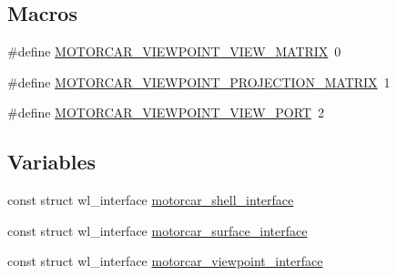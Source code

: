 \subsection*{Macros}
\begin{DoxyCompactItemize}
\item 
\#define \hyperlink{clients_2simple-egl_2motorcar-server-protocol_8h_a3cec8e451ef597650403195a97bfd54c}{M\-O\-T\-O\-R\-C\-A\-R\-\_\-\-V\-I\-E\-W\-P\-O\-I\-N\-T\-\_\-\-V\-I\-E\-W\-\_\-\-M\-A\-T\-R\-I\-X}~0
\item 
\#define \hyperlink{clients_2simple-egl_2motorcar-server-protocol_8h_a90193588ef42c30b79a2547016ecfbef}{M\-O\-T\-O\-R\-C\-A\-R\-\_\-\-V\-I\-E\-W\-P\-O\-I\-N\-T\-\_\-\-P\-R\-O\-J\-E\-C\-T\-I\-O\-N\-\_\-\-M\-A\-T\-R\-I\-X}~1
\item 
\#define \hyperlink{clients_2simple-egl_2motorcar-server-protocol_8h_a679a63a4096a3edc578272e2308ea515}{M\-O\-T\-O\-R\-C\-A\-R\-\_\-\-V\-I\-E\-W\-P\-O\-I\-N\-T\-\_\-\-V\-I\-E\-W\-\_\-\-P\-O\-R\-T}~2
\end{DoxyCompactItemize}
\subsection*{Variables}
\begin{DoxyCompactItemize}
\item 
const struct wl\-\_\-interface \hyperlink{clients_2simple-egl_2motorcar-server-protocol_8h_a4decf5a74ff7a553e7cb41be3a9c580e}{motorcar\-\_\-shell\-\_\-interface}
\item 
const struct wl\-\_\-interface \hyperlink{clients_2simple-egl_2motorcar-server-protocol_8h_ae2e8f3ce5b87226a6df640361441f5ce}{motorcar\-\_\-surface\-\_\-interface}
\item 
const struct wl\-\_\-interface \hyperlink{clients_2simple-egl_2motorcar-server-protocol_8h_a90843869d07a9812f0b0eb66ed03ed20}{motorcar\-\_\-viewpoint\-\_\-interface}
\end{DoxyCompactItemize}


